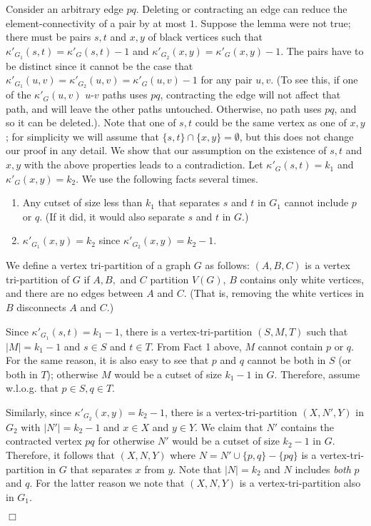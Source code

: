 \documentclass[11pt]{article}
\newcommand{\elconn}{\kappa'}
\renewenvironment{proof}{\vspace{-0.1in}\noindent{\bf Proof:}}{\hspace*{\fill}$\Box$\par}
\begin{document}
\begin{proof}
  Consider an arbitrary edge $pq$. Deleting or contracting an edge can
  reduce the element-connectivity of a pair by at most $1$.  Suppose
  the lemma were not true; there must be pairs $s,t$ and $x,y$ of
  black vertices such that $\elconn_{G_1}(s,t) = \elconn_G(s,t) - 1$
  and $\elconn_{G_2}(x,y) = \elconn_G(x,y) - 1$. The pairs have to be
  distinct since it cannot be the case that $\elconn_{G_1}(u,v) =
  \elconn_{G_2}(u,v) = \elconn_G(u,v) - 1$ for any pair $u,v$. (To see
  this, if one of the $\elconn_G(u,v)$ $u$-$v$ paths uses $pq$,
  contracting the edge will not affect that path, and will leave the
  other paths untouched. Otherwise, no path uses $pq$, and so it can
  be deleted.). Note that one of $s,t$ could be the same vertex as one
  of $x,y$; for simplicity we will assume that $\{s,t\} \cap \{x,y\} =
  \emptyset$, but this does not change our proof in any detail.  We
  show that our assumption on the existence of $s,t$ and $x,y$ with
  the above properties leads to a contradiction. Let $\elconn_{G}(s,t)
  = k_1$ and $\elconn_G(x,y) = k_2$. We use the following facts
  several times. 

  \vspace{-0.15in}
  \begin{enumerate}
    \item Any cutset of size less than $k_1$ that separates $s$ and
      $t$ in $G_1$ cannot include $p$ or $q$. (If it did, it would
      also separate $s$ and $t$ in $G$.)

    \item $\elconn_{G_1}(x,y) = k_2$ since $\elconn_{G_2}(x,y) = k_2 - 1$.
  \end{enumerate}

  We define a vertex tri-partition of a graph $G$ as follows:
  $(A,B,C)$ is a vertex tri-partition of $G$ if $A,B,$ and $C$
  partition $V(G)$, $B$ contains only white vertices, and there are no
  edges between $A$ and $C$. (That is, removing the white vertices in
  $B$ disconnects $A$ and $C$.)

  Since $\elconn_{G_1}(s,t) = k_1 - 1$, there is a
  vertex-tri-partition $(S,M,T)$ such that $|M| = k_1-1$ and $s \in S$
  and $t \in T$.  From Fact 1 above, $M$ cannot contain $p$ or
  $q$. For the same reason, it is also easy to see that $p$ and $q$
  cannot be both in $S$ (or both in $T$); otherwise $M$ would be a
  cutset of size $k_1-1$ in $G$. Therefore, assume w.l.o.g. that $p
  \in S, q \in T$.
  
  Similarly, since $\elconn_{G_2}(x,y) = k_2 - 1$, there is a
  vertex-tri-partition $(X,N',Y)$ in $G_2$ with $|N'| = k_2 - 1$ and
  $x \in X$ and $y \in Y$. We claim that $N'$ contains the contracted
  vertex $pq$ for otherwise $N'$ would be a cutset of size $k_2-1$ in
  $G$. Therefore, it follows that $(X,N,Y)$ where $N = N' \cup
  \{p,q\}- \{pq\}$ is a vertex-tri-partition in $G$ that separates $x$
  from $y$. Note that $|N| = k_2$ and $N$ includes {\em both} $p$ and $q$.
  For the latter reason we note that $(X,N,Y)$ is a vertex-tri-partition
  also in $G_1$.


\end{proof}
\end{document}
